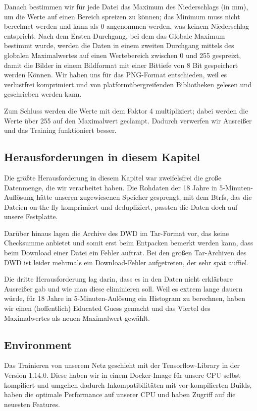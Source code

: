 \documentclass[11pt]{article}
\begin{document}
Danach bestimmen wir für jede Datei das Maximum des Niederschlags (in mm), um die Werte auf einen Bereich spreizen zu können; das Minimum muss nicht berechnet werden und kann als 0 angenommen werden, was keinem Niederschlag entspricht.
Nach dem Ersten Durchgang, bei dem das Globale Maximum bestimmt wurde, werden die Daten in einem zweiten Durchgang mittels  des globalen Maximalwertes auf einen Wertebereich zwischen 0 und 255 gespreizt, damit die Bilder in einem Bildformat mit einer Bittiefe von 8 Bit gespeichert werden Können. Wir haben uns für das PNG-Format entschieden, weil es verlustfrei komprimiert und von platformübergreifenden Bibliotheken gelesen und geschrieben werden kann.

Zum Schluss werden die Werte mit dem Faktor 4 multipliziert; dabei werden die Werte über 255 auf den Maximalwert geclampt. Dadurch verwerfen wir Ausreißer und das Training funktioniert besser.

\subsection{Herausforderungen in diesem Kapitel}
Die größte Herausforderung in diesem Kapitel war zweifelsfrei die große Datenmenge, die wir verarbeitet haben. Die Rohdaten der 18 Jahre in 5-Minuten-Auflösung hätte unseren zugewiesenen Speicher gesprengt, mit dem Btrfs, das die Dateien on-the-fly komprimiert und dedupliziert, passten die Daten doch auf unsere Festplatte.

Darüber hinaus lagen die Archive des DWD im Tar-Format vor, das keine Checksumme anbietet und somit erst beim Entpacken bemerkt werden kann, dass beim Download einer Datei ein Fehler auftrat. Bei den großen Tar-Archiven des DWD ist leider mehrmals ein Download-Fehler aufgetreten, der sehr spät auffiel.

Die dritte Herausforderung lag darin, dass es in den Daten nicht erklärbare Ausreißer gab und wie man diese eliminieren soll. Weil es extrem lange dauern würde, für 18 Jahre in 5-Minuten-Aulösung ein Histogram zu berechnen, haben wir einen (hoffentlich) Educated Guess gemacht und das Viertel des Maximalwertes als neuen Maximalwert gewählt.


\subsection{Environment}
Das Trainieren von unserem Netz geschieht mit der Tensorflow-Library in der Version 1.14.0. Diese haben wir in einem Docker-Image für unsere CPU selbst kompiliert und umgehen dadurch Inkompatibilitäten mit vor-kompilierten Builds, haben die optimale Performance auf unserer CPU und haben Zugriff auf die neuesten Features.
\end{document}
